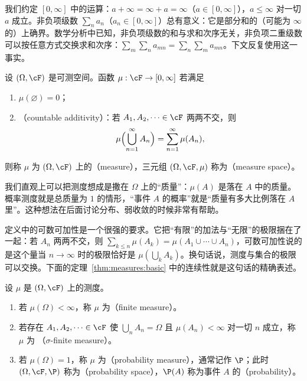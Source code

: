 
我们约定 $[0,\infty]$ 中的运算：$a+\infty=\infty+a=\infty$（$a\in[0,\infty]$），$a\leqslant\infty$ 对一切 $a$ 成立。非负项级数 $\sum_na_n$（$a_n\in[0,\infty]$）总有意义：它是部分和的（可能为 $\infty$ 的）上确界。数学分析中已知，非负项级数的和与求和次序无关，非负项二重级数可以按任意方式交换求和次序：$\sum_m\sum_na_{mn}=\sum_n\sum_ma_{mn}$。下文反复使用这一事实。

\begin{definition}[测度]\label{def:measures:measure}
设 $(\Omega,\cF)$ 是可测空间。函数 $\mu:\cF\to[0,\infty]$ 若满足
\begin{enumerate}
\item $\mu(\varnothing)=0$；
\item {}（countable additivity）：若 $A_1,A_2,\dots\in\cF$ 两两不交，则
\[
\mu\Bigl(\bigcup_{n=1}^\infty A_n\Bigr)=\sum_{n=1}^\infty\mu(A_n),
\]
\end{enumerate}
则称 $\mu$ 为 $(\Omega,\cF)$ 上的（measure），三元组 $(\Omega,\cF,\mu)$ 称为（measure space）。
\end{definition}

\begin{remark}
我们直观上可以把测度想成是撒在 $\Omega$ 上的“质量”：$\mu(A)$ 是落在 $A$ 中的质量。概率测度就是总质量为 $1$ 的情形，“事件 $A$ 的概率”就是“质量有多大比例落在 $A$ 里”。这种想法在后面讨论分布、弱收敛的时候非常有帮助。

定义中的可数可加性是一个很强的要求。它把“有限”的加法与“无限”的极限捆在了一起：若 $A_n$ 两两不交，则 $\sum_{k\leqslant n}\mu(A_k)=\mu(A_1\cup\cdots\cup A_n)$，可数可加性说的是这个量当 $n\to\infty$ 时的极限恰好是 $\mu(\bigcup_kA_k)$。换句话说，测度与集合的极限可以交换。下面的定理~\ref{thm:measures:basic} 中的连续性就是这句话的精确表述。
\end{remark}

\begin{definition}\label{def:measures:finite}
设 $\mu$ 是 $(\Omega,\cF)$ 上的测度。
\begin{enumerate}
\item 若 $\mu(\Omega)<\infty$，称 $\mu$ 为（finite measure）。
\item 若存在 $A_1,A_2,\dots\in\cF$ 使 $\bigcup_nA_n=\Omega$ 且 $\mu(A_n)<\infty$ 对一切 $n$ 成立，称 $\mu$ 为 （$\sigma$-finite measure）。
\item 若 $\mu(\Omega)=1$，称 $\mu$ 为（probability measure），通常记作 $\P$；此时 $(\Omega,\cF,\P)$ 称为（probability space），$\P(A)$ 称为事件 $A$ 的（probability）。
\end{enumerate}
\end{definition}

